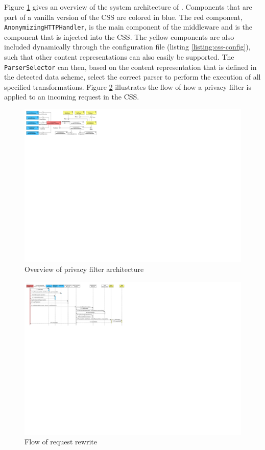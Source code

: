 Figure \ref{fig:arch-overview} gives an overview of the system architecture of \middleware{}. Components that are part of a vanilla version of the \gls{CSS} are colored in blue. The red component, \texttt{AnonymizingHTTPHandler}, is the main component of the middleware and is the component that is injected into the \gls{CSS}. The yellow components are also included dynamically through the configuration file (listing \ref{listing:css-config}), such that other content representations can also easily be supported. The \texttt{ParserSelector} can then, based on the content representation that is defined in the detected data scheme, select the correct parser to perform the execution of all specified transformations. 
Figure \ref{fig:pepsa-sequence} illustrates the flow of how a privacy filter is applied to an incoming request in the \gls{CSS}.

\begin{figure}
    \centering
    \includegraphics[width=1.0\textwidth]{images/architecture/PePSA-System-Overview.pdf}
    \caption{Overview of \middleware{} privacy filter architecture}
    \label{fig:arch-overview}
\end{figure}



\begin{figure}
    \centering
    \includegraphics[width=1.0\textwidth]{images/architecture/InteractionDiagram-Rewrite-Flow-PePSA.pdf}
    \caption{Flow of \middleware{} request rewrite}
    \label{fig:pepsa-sequence}
\end{figure}